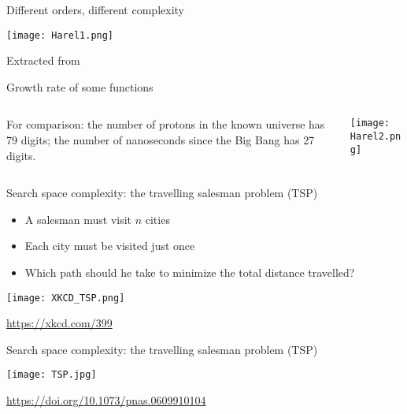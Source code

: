 \documentclass[c]{beamer}
\begin{document}
\begin{frame}{Different orders, different complexity}
  \begin{center}
    \texttt{[image: Harel1.png]}
  \end{center}
  Extracted from \cite{harel}
\end{frame}

\begin{frame}[t]{Growth rate of some functions}
  \begin{columns}
    \begin{column}{0.4\textwidth}
      For comparison: the number of protons in the known universe has 79 digits; the number of nanoseconds since the Big Bang has 27 digits.\cite{harel}
    \end{column}
    \begin{column}{0.5\textwidth}
      \begin{center}
        \texttt{[image: Harel2.png]}
      \end{center}
    \end{column}
  \end{columns}
\end{frame}

\begin{frame}[t]{Search space complexity: the travelling salesman problem (TSP)}
      \begin{itemize}
        \item A salesman must visit $n$ cities
        \item Each city must be visited just once
        \item Which path should he take to minimize the total distance travelled?
      \end{itemize}
      \begin{center}
        \texttt{[image: XKCD\_TSP.png]}
      \end{center}
      \url{https://xkcd.com/399}
\end{frame}

\begin{frame}[t]{Search space complexity: the travelling salesman problem (TSP)}
  \begin{center}
    \texttt{[image: TSP.jpg]}
  \end{center}
  \url{https://doi.org/10.1073/pnas.0609910104}
\end{frame}
\end{document}
